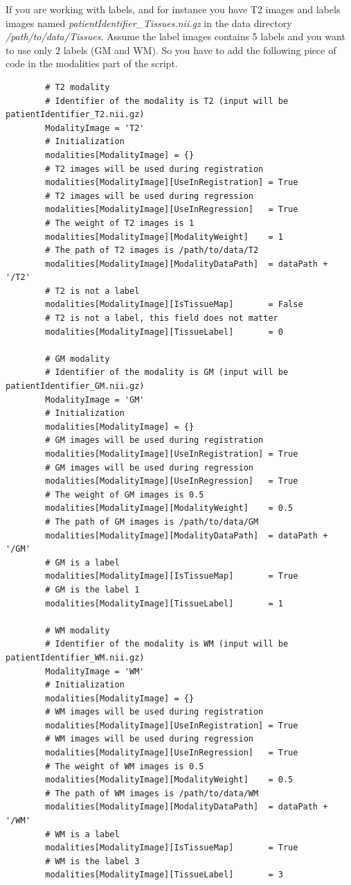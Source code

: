     If you are working with labels, and for instance you have T2 images and labels images named \emph{patientIdentifier\_Tissues.nii.gz} in the data directory \emph{/path/to/data/Tissues}. Assume the label images contains 5 labels and you want to use only 2 labels (GM and WM). So you have to add the following piece of code in the modalities part of the script.
    \begin{verbatim}
        # T2 modality
        # Identifier of the modality is T2 (input will be patientIdentifier_T2.nii.gz)
        ModalityImage = 'T2'
        # Initialization
        modalities[ModalityImage] = {}
        # T2 images will be used during registration
        modalities[ModalityImage][UseInRegistration] = True
        # T2 images will be used during regression
        modalities[ModalityImage][UseInRegression]   = True
        # The weight of T2 images is 1
        modalities[ModalityImage][ModalityWeight]    = 1
        # The path of T2 images is /path/to/data/T2
        modalities[ModalityImage][ModalityDataPath]  = dataPath + '/T2'
        # T2 is not a label
        modalities[ModalityImage][IsTissueMap]       = False
        # T2 is not a label, this field does not matter
        modalities[ModalityImage][TissueLabel]       = 0
        
        # GM modality
        # Identifier of the modality is GM (input will be patientIdentifier_GM.nii.gz)
        ModalityImage = 'GM'
        # Initialization
        modalities[ModalityImage] = {}
        # GM images will be used during registration
        modalities[ModalityImage][UseInRegistration] = True
        # GM images will be used during regression
        modalities[ModalityImage][UseInRegression]   = True
        # The weight of GM images is 0.5
        modalities[ModalityImage][ModalityWeight]    = 0.5
        # The path of GM images is /path/to/data/GM
        modalities[ModalityImage][ModalityDataPath]  = dataPath + '/GM'
        # GM is a label
        modalities[ModalityImage][IsTissueMap]       = True
        # GM is the label 1
        modalities[ModalityImage][TissueLabel]       = 1
        
        # WM modality
        # Identifier of the modality is WM (input will be patientIdentifier_WM.nii.gz)
        ModalityImage = 'WM'
        # Initialization
        modalities[ModalityImage] = {}
        # WM images will be used during registration
        modalities[ModalityImage][UseInRegistration] = True
        # WM images will be used during regression
        modalities[ModalityImage][UseInRegression]   = True
        # The weight of WM images is 0.5
        modalities[ModalityImage][ModalityWeight]    = 0.5
        # The path of WM images is /path/to/data/WM
        modalities[ModalityImage][ModalityDataPath]  = dataPath + '/WM'
        # WM is a label
        modalities[ModalityImage][IsTissueMap]       = True
        # WM is the label 3
        modalities[ModalityImage][TissueLabel]       = 3
    \end{verbatim}

